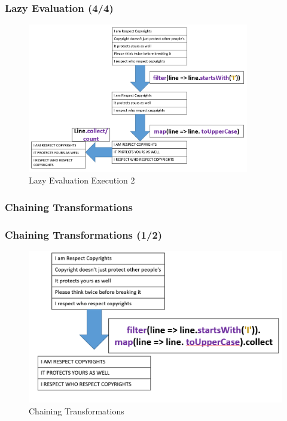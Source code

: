 \begin{frame}
	  \frametitle{Lazy Evaluation (4/4)}
	    \begin{figure}
	  	\caption{Lazy Evaluation Execution 2}  
			\includegraphics[width=\textwidth,height=6.5cm]{Graphics/lazy2.PNG}
		\end{figure}
\end{frame}

%
%
%


\subsubsection{Chaining Transformations}
\begin{frame}
	  \frametitle{Chaining Transformations (1/2)}
	    \begin{figure}
	  	\caption{Chaining Transformations}  		  	
			\includegraphics[width=\textwidth]{Graphics/chain.PNG}
		\end{figure}
	
\end{frame}


